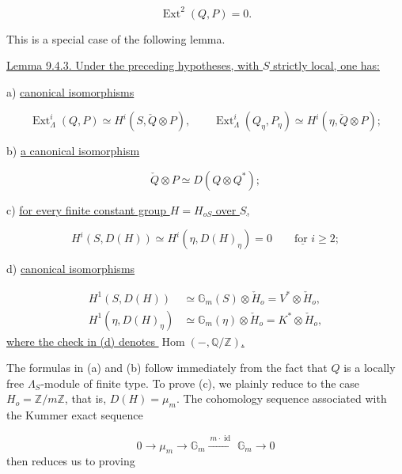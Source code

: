 \begin{equation*}
\operatorname{Ext}^2(Q,P)=0.
\end{equation*}

This is a special case of the following lemma.

\medskip
\noindent
\underline{Lemma 9.4.3. Under the preceding hypotheses, with $S$ strictly
local, one has:}

\smallskip
\noindent
a) \underline{canonical isomorphisms}

\begin{equation*}
\operatorname{Ext}^i_\Lambda(Q,P)\simeq
H^i(S,\check Q\otimes P),
\qquad
\operatorname{Ext}^i_\Lambda(Q_\eta,P_\eta)\simeq
H^i(\eta,\check Q\otimes P);
\end{equation*}

\noindent
b) \underline{a canonical isomorphism}

\begin{equation}\tag{b)}
\check Q\otimes P\simeq D(Q\otimes Q^*);
\end{equation}

\noindent
c) \underline{for every finite constant group $H=H_{oS}$ over $S$,}

\begin{equation}\tag{c)}
H^i(S,D(H))\simeq H^i(\eta,D(H)_\eta)=0
\qquad\underline{\text{for }}i\geq2;
\end{equation}

\noindent
d) \underline{canonical isomorphisms}

\begin{equation}\tag{d)}
\begin{aligned}
H^1(S,D(H))&\simeq\mathbb G_m(S)\otimes\check H_o
              =V^*\otimes\check H_o,\\
H^1(\eta,D(H)_\eta)&\simeq\mathbb G_m(\eta)\otimes\check H_o
              =K^*\otimes\check H_o,
\end{aligned}
\end{equation}
\underline{where the check in (d) denotes $\operatorname{Hom}(-,\mathbb
Q/\mathbb Z)$.}

The formulas in (a) and (b) follow immediately from the fact that $Q$ is a
locally free $\Lambda_S$-module of finite type. To prove (c), we plainly
reduce to the case $H_o=\mathbb Z/m\mathbb Z$, that is,
$D(H)=\mu_m$. The cohomology sequence associated with the Kummer exact
sequence

\begin{equation*}
0\longrightarrow\mu_m\longrightarrow\mathbb G_m
 \xrightarrow{\ m\cdot\operatorname{id}\ }\mathbb G_m
 \longrightarrow0
\end{equation*}
then reduces us to proving

